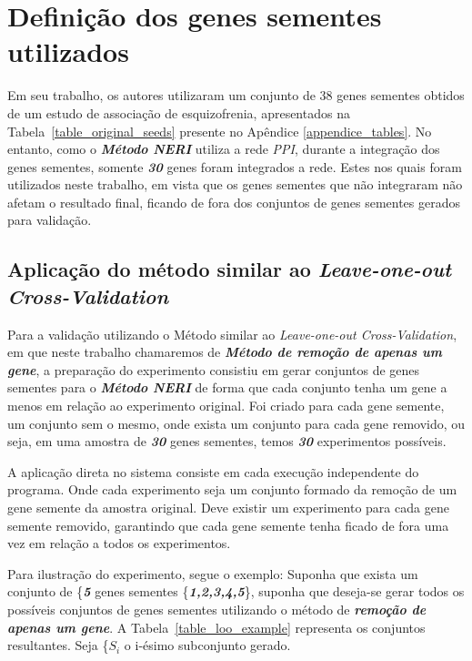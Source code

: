 \section{Definição dos genes sementes utilizados}

%
Em seu trabalho, os autores \cite{SIMOES2015} utilizaram um conjunto de 38 genes sementes obtidos de um estudo de associação de esquizofrenia, apresentados na Tabela~\ref{table_original_seeds} presente no Apêndice \ref{appendice_tables}.
%
%
No entanto, como o \textsl{\textbf{Método NERI}} utiliza a rede \textsl{PPI}, durante a integração dos genes sementes, somente \textsl{\textbf{30}} genes foram integrados a rede. Estes nos quais foram utilizados neste trabalho, em vista que os genes sementes que não integraram não afetam o resultado final, ficando de fora dos conjuntos de genes sementes gerados para validação.

\subsection{Aplicação do método similar ao  \textsl{Leave-one-out Cross-Validation}}

Para a validação utilizando o Método similar ao \textsl{Leave-one-out Cross-Validation}, em que neste trabalho chamaremos de \textsl{\textbf{Método de remoção de apenas um gene}}, a preparação do experimento consistiu em gerar conjuntos de genes sementes para o \textsl{\textbf{Método NERI}} de forma que cada conjunto tenha um gene a menos em relação ao experimento original. Foi criado para cada gene semente, um conjunto sem o mesmo, onde exista um conjunto para cada gene removido, ou seja, em uma amostra de \textsl{\textbf{30}} genes sementes, temos \textsl{\textbf{30}} experimentos possíveis.

A aplicação direta no sistema consiste em cada execução independente do programa. Onde cada experimento seja um conjunto formado da remoção de um gene semente da amostra original. Deve existir um experimento para cada gene semente removido, garantindo que cada gene semente tenha ficado de fora uma vez em relação a todos os experimentos.



%
Para ilustração do experimento, segue o exemplo: Suponha que exista um conjunto de \{\textsl{\textbf{5}} genes sementes \{\textsl{\textbf{1,2,3,4,5}}\}, suponha que deseja-se gerar todos os possíveis conjuntos de genes sementes utilizando o método de \textsl{\textbf{remoção de apenas um gene}}. A Tabela~\ref{table_loo_example} representa os conjuntos resultantes. Seja \{\textsl{\textbf{$S_i$}} o i-ésimo subconjunto gerado.

